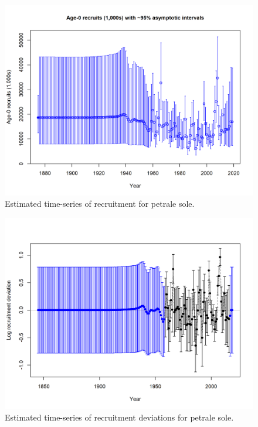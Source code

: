 \documentclass[12pt,]{article}
\begin{document}
\FloatBarrier 

\begin{figure}
\centering
\includegraphics{r4ss/plots_mod1/ts11_Age-0_recruits_(1000s)_with_95_asymptotic_intervals.png}
\caption{Estimated time-series of recruitment for petrale sole.
\label{fig:recruits}}
\end{figure}

\FloatBarrier

\begin{figure}
\centering
\includegraphics{r4ss/plots_mod1/recdevs2_withbars.png}
\caption{Estimated time-series of recruitment deviations for petrale
sole. \label{fig:recdevs}}
\end{figure}
\end{document}
